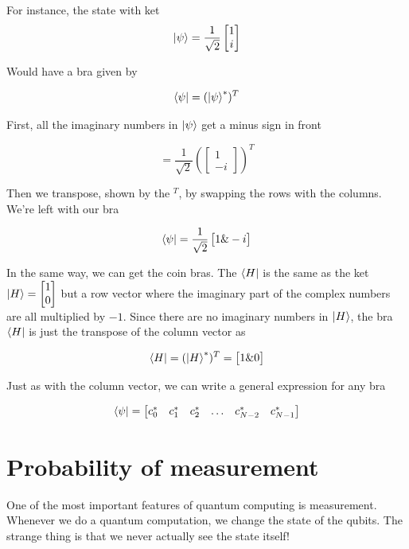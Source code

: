 \documentclass{book}
\begin{document}
For instance, the state with ket
$$\ket{\psi} = \frac{1}{\sqrt{2}} \begin{bmatrix} 1 \\ i \end{bmatrix} $$

Would have a bra given by 

$$
\bra{\psi} = (\ket{\psi}^*)^T 
$$

First, all the imaginary numbers in $\ket{\psi}$ get a minus sign in front 

 $$= \frac{1}{\sqrt{2}} \left(\begin{bmatrix} 1 \\ -i \end{bmatrix} \right)^T $$

Then we transpose, shown by the $^T$, by swapping the rows with the columns. We're left with our bra

$$\bra{\psi} = \frac{1}{\sqrt{2}} \begin{bmatrix} 1 \& -i \end{bmatrix} $$


In the same way, we can get the coin bras. The $\bra{H}$ is the same as the ket $\ket{H} = \begin{bmatrix} 1 \\ 0 \end{bmatrix}$ but a row vector where the imaginary part of the complex numbers are all multiplied by $-1$. Since there are no imaginary numbers in $\ket{H}$, the bra $\bra{H}$ is just the transpose of the column vector as

$$
\bra{H} = (\ket{H}^*)^T = \begin{bmatrix} 1 \& 0 \end{bmatrix}
$$

Just as with the column vector, we can write a general expression for any bra

$$
\bra{\psi} = \begin{bmatrix} c_0^* & c_1^* & c_2^* & \dots & c_{N-2}^* & c_{N-1}^* \end{bmatrix}
$$


\section{ Probability of measurement}


One of the most important features of quantum computing is measurement. Whenever we do a quantum computation, we change the state of the qubits. The strange thing is that we never actually see the state itself! 
\end{document}
